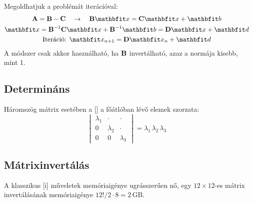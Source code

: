 \documentclass[../../main.tex]{subfiles}
\begin{document}
Megoldhatjuk a problémát iterációval:
\begin{gather*}
  \rmat A = \rmat B - \rmat C
  \quad \rightarrow \quad
  \rmat B \rvec x = \rmat C \rvec x + \rvec b
  \\
  \rvec x
  = \rmat B^{-1} \rmat C \rvec x + \rmat B^{-1} \rvec b
  = \rmat D \rvec x + \rvec d
  \\
  \text{Iteráció: }
  \rvec x_{n+1} = \rmat D \rvec x_n + \rvec d
\end{gather*}
A módszer csak akkor használható, ha $\mathbf{B}$ invertálható, azaz a normája
kisebb, mint 1.

\subsection{Determináns}

Háromszög mátrix esetében a [] a főátlóban lévő elemek szorzata:
\[
  \begin{vmatrix}
    \lambda_1 & \cdot     & \cdot     \\
    0         & \lambda_2 & \cdot     \\
    0         & 0         & \lambda_3
  \end{vmatrix}
  = \lambda_1 \, \lambda_2 \, \lambda_3
\]

\subsection{Mátrixinvertálás}

A klasszikus [i] műveletek memóriaigénye ugrásszerűen nő,
egy $12 \times 12$-es mátrix invertálásának memóriaigénye
$12! / 2 \cdot 8 = 2\,\mathrm{GB}$.
\end{document}
